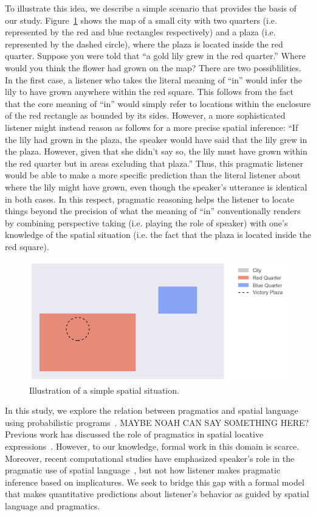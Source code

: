\documentclass[10pt,letterpaper]{article}
\begin{document}
To illustrate this idea, we describe a simple scenario that provides the basis of our study. Figure~\ref{illustration} shows the map of a small city with two quarters (i.e. represented by the red and blue rectangles respectively) and a plaza (i.e. represented by the dashed circle), where the plaza is located inside the red quarter. Suppose you were told that ``a gold lily grew in the red quarter.'' Where would you think the flower had grown on the map? There are two possiblilities. In the first case, a listener who takes the literal meaning of ``in'' would infer the lily to have grown anywhere within the red square. This follows from the fact that the core meaning of ``in'' would simply refer to locations within the enclosure of the red rectangle as bounded by its sides. However, a more sophisticated listener might instead reason as follows for a more precise spatial inference: ``If the lily had grown in the plaza, the speaker would have said that the lily grew in the plaza. However, given that she didn't say so, the lily must have grown within the red quarter but in areas excluding that plaza.'' Thus, this pragmatic listener would be able to make a more specific prediction than the literal listener about where the lily might have grown, even though the speaker's utterance is identical in both cases. In this respect, pragmatic reasoning helps the listener to locate things beyond the precision of what the meaning of ``in'' conventionally renders by combining perspective taking (i.e. playing the role of speaker) with one's knowledge of the spatial situation (i.e. the fact that the plaza is located inside the red square).

\begin{figure}[h]
\includegraphics[scale=.5]{figures/cityA1.png}
\caption{Illustration of a simple spatial situation.}
\label{illustration}
\end{figure}

In this study, we explore the relation between pragmatics and spatial language using probabilistic programs~\cite{}. MAYBE NOAH CAN SAY SOMETHING HERE? Previous work has discussed the role of pragmatics in spatial locative expressions~\cite{herskovits85,herskovits87}. However, to our knowledge, formal work in this domain is scarce. Moreover, recent computational studies have emphasized speaker's role in the pragmatic use of spatial language~\cite{carstensen14,golland10}, but not how listener makes pragmatic inference based on implicatures. We seek to bridge this gap with a formal model that makes quantitative predictions about listener's behavior as guided by spatial language and pragmatics. 
\end{document}
